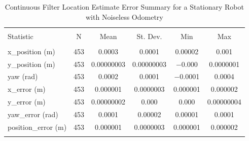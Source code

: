 
\begin{table}[htbp] \centering 
  \caption{Continuous Filter Location Estimate Error Summary for a Stationary Robot with Noiseless Odometry} 
  \label{tab:one_stationary_noiseless_continuous_summary} 
\begin{tabular}{@{\extracolsep{5pt}}lccccc} 
\\[-1.8ex]\hline 
\hline \\[-1.8ex] 
Statistic & \multicolumn{1}{c}{N} & \multicolumn{1}{c}{Mean} & \multicolumn{1}{c}{St. Dev.} & \multicolumn{1}{c}{Min} & \multicolumn{1}{c}{Max} \\ 
\hline \\[-1.8ex] 
x\_position (m) & 453 & \num{0.0003} & \num{0.0001} & \num{0.00002} & \num{0.001} \\ 
y\_position (m) & 453 & \num{0.00000003} & \num{0.00000003} & \num{-0.000} & \num{0.0000001} \\ 
yaw (rad) & 453 & \num{0.0002} & \num{0.0001} & \num{-0.0001} & \num{0.0004} \\ 
x\_error (m) & 453 & \num{0.000001} & \num{0.0000003} & \num{0.000001} & \num{0.000002} \\ 
y\_error (m) & 453 & \num{0.00000002} & \num{0.000} & \num{0.000} & \num{0.00000004} \\ 
yaw\_error (rad) & 453 & \num{0.0001} & \num{0.00002} & \num{0.00001} & \num{0.0001} \\ 
position\_error (m) & 453 & \num{0.000001} & \num{0.0000003} & \num{0.000001} & \num{0.000002} \\ 
\hline \\[-1.8ex] 
\end{tabular} 
\end{table} 

